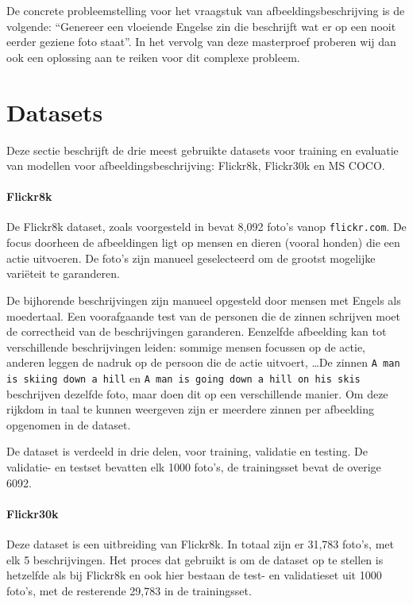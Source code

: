 De concrete probleemstelling voor het vraagstuk van afbeeldingsbeschrijving is de volgende: ``Genereer een vloeiende Engelse zin die beschrijft wat er op een nooit eerder geziene foto staat''. In het vervolg van deze masterproef proberen wij dan ook een oplossing aan te reiken voor dit complexe probleem.

\section{Datasets}
\label{sec:Datasets}
Deze sectie beschrijft de drie meest gebruikte datasets voor training en evaluatie van modellen voor afbeeldingsbeschrijving: Flickr8k, Flickr30k en MS COCO.

\paragraph{Flickr8k}
\label{par:Flickr8k}
De Flickr8k dataset, zoals voorgesteld in \cite{Hodosh2013} bevat 8,092 foto's vanop \texttt{flickr.com}. De focus doorheen de afbeeldingen ligt op mensen en dieren (vooral honden) die een actie uitvoeren. De foto's zijn manueel geselecteerd om de grootst mogelijke vari\"eteit te garanderen.

De bijhorende beschrijvingen zijn manueel opgesteld door mensen met Engels als moedertaal. Een voorafgaande test van de personen die de zinnen schrijven moet de correctheid van de beschrijvingen garanderen. Eenzelfde afbeelding kan tot verschillende beschrijvingen leiden: sommige mensen focussen op de actie, anderen leggen de nadruk op de persoon die de actie uitvoert, \ldots De zinnen \texttt{A man is skiing down a hill} en \texttt{A man is going down a hill on his skis} beschrijven dezelfde foto, maar doen dit op een verschillende manier. Om deze rijkdom in taal te kunnen weergeven zijn er meerdere zinnen per afbeelding opgenomen in de dataset.

De dataset is verdeeld in drie delen, voor training, validatie en testing. De validatie- en testset bevatten elk 1000 foto's, de trainingsset bevat de overige 6092.


\paragraph{Flickr30k}
\label{par:Flickr30k}
Deze dataset \cite{Young2014} is een uitbreiding van Flickr8k. In totaal zijn er 31,783 foto's, met elk 5 beschrijvingen. Het proces dat gebruikt is om de dataset op te stellen is hetzelfde als bij Flickr8k \cite{Hodosh2013} en ook hier bestaan de test- en validatieset uit 1000 foto's, met de resterende 29,783 in de trainingsset.


